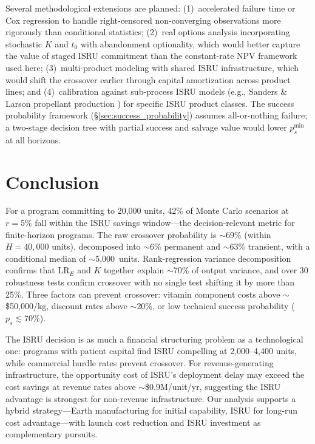 \documentclass[preprint,12pt]{elsarticle}
\begin{document}
Several methodological extensions are planned: (1)~accelerated failure time or Cox regression to handle right-censored non-converging observations more rigorously than conditional statistics; (2)~real options analysis incorporating stochastic $K$ and $t_0$ with abandonment optionality, which would better capture the value of staged ISRU commitment than the constant-rate NPV framework used here; (3)~multi-product modeling with shared ISRU infrastructure, which would shift the crossover earlier through capital amortization across product lines; and (4)~calibration against sub-process ISRU models (e.g., Sanders \& Larson propellant production \cite{sanders2015}) for specific ISRU product classes. The success probability framework (\S\ref{sec:success_probability}) assumes all-or-nothing failure; a two-stage decision tree with partial success and salvage value would lower $p_s^{\min}$ at all horizons.

\section{Conclusion}
\label{sec:conclusion}

For a program committing to 20{,}000 units, 42\% of Monte Carlo scenarios at $r = 5\%$ fall within the ISRU savings window---the decision-relevant metric for finite-horizon programs. The raw crossover probability is ${\sim}$69\% (within $H = 40{,}000$ units), decomposed into ${\sim}$6\% permanent and ${\sim}$63\% transient, with a conditional median of $\sim$5{,}000~units. Rank-regression variance decomposition confirms that LR$_E$ and $K$ together explain ${\sim}$70\% of output variance, and over 30 robustness tests confirm crossover with no single test shifting it by more than 25\%. Three factors can prevent crossover: vitamin component costs above ${\sim}$\$50{,}000/kg, discount rates above ${\sim}$20\%, or low technical success probability ($p_s \lesssim 70\%$).

The ISRU decision is as much a financial structuring problem as a technological one: programs with patient capital find ISRU compelling at 2{,}000--4{,}400 units, while commercial hurdle rates prevent crossover. For revenue-generating infrastructure, the opportunity cost of ISRU's deployment delay may exceed the cost savings at revenue rates above ${\sim}$\$0.9M/unit/yr, suggesting the ISRU advantage is strongest for non-revenue infrastructure. Our analysis supports a hybrid strategy---Earth manufacturing for initial capability, ISRU for long-run cost advantage---with launch cost reduction and ISRU investment as complementary pursuits.
\end{document}
